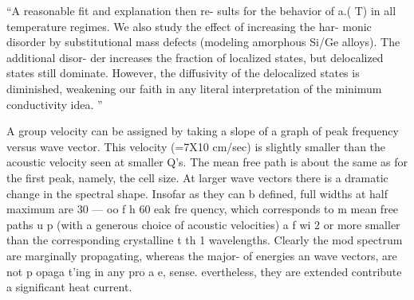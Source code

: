 \documentclass[aps,prb,preprint,superscriptaddress,amsmath,amssymb,floatfix]{revtex4}
\begin{document}
``A reasonable fit and explanation then re-
sults for the behavior of a.( T) in all temperature regimes. We also study the effect of increasing the har-
monic disorder by substitutional mass defects (modeling amorphous Si/Ge alloys). The additional disor-
der increases the fraction of localized states, but delocalized states still dominate. However, the
diffusivity of the delocalized states is diminished, weakening our faith in any literal interpretation of the
minimum conductivity idea.
'' \cite{feldman_thermal_1993}


A group velocity can be assigned by taking
a slope of a graph of peak frequency versus wave vector.
This velocity (=7X10 cm/sec) is slightly smaller than
the acoustic velocity seen at smaller Q's. The mean free
path is about the same as for the first peak, namely, the
cell size. At larger wave vectors there is a dramatic
change in the spectral shape. Insofar as they can b
defined, full widths at half maximum are 30 —
oo f h
60%
eak fre quency, which corresponds to m
mean free paths
u
p
(with a generous choice of acoustic velocities) a f
wi
2 or more smaller than the corresponding crystalline
t th 1
wavelengths.
Clearly the mod
spectrum are marginally propagating, whereas the major-
of energies an wave vectors, are not p opaga t'ing in any
pro a
e,
sense.
evertheless, they are extended
contribute a significant heat current.
\cite{feldman_thermal_1993}


\end{document}
